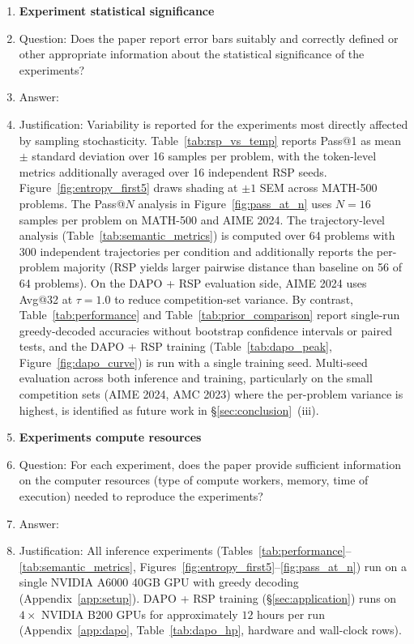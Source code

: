 \begin{enumerate}
\item {\bf Experiment statistical significance}\label{checklist:significance}
    \item[] Question: Does the paper report error bars suitably and correctly defined or other appropriate information about the statistical significance of the experiments?
    \item[] Answer: \answerNo{}
    \item[] Justification: Variability is reported for the experiments most directly affected by sampling stochasticity. Table~\ref{tab:rsp_vs_temp} reports Pass@1 as mean $\pm$ standard deviation over 16 samples per problem, with the token-level metrics additionally averaged over 16 independent RSP seeds. Figure~\ref{fig:entropy_first5} draws shading at $\pm 1$ SEM across MATH-500 problems. The Pass@$N$ analysis in Figure~\ref{fig:pass_at_n} uses $N=16$ samples per problem on MATH-500 and AIME 2024. The trajectory-level analysis (Table~\ref{tab:semantic_metrics}) is computed over 64 problems with 300 independent trajectories per condition and additionally reports the per-problem majority (RSP yields larger pairwise distance than baseline on 56 of 64 problems). On the DAPO + RSP evaluation side, AIME 2024 uses Avg@32 at $\tau=1.0$ to reduce competition-set variance. By contrast, Table~\ref{tab:performance} and Table~\ref{tab:prior_comparison} report single-run greedy-decoded accuracies without bootstrap confidence intervals or paired tests, and the DAPO + RSP training (Table~\ref{tab:dapo_peak}, Figure~\ref{fig:dapo_curve}) is run with a single training seed. Multi-seed evaluation across both inference and training, particularly on the small competition sets (AIME 2024, AMC 2023) where the per-problem variance is highest, is identified as future work in \S\ref{sec:conclusion}~(iii).

\item {\bf Experiments compute resources}
    \item[] Question: For each experiment, does the paper provide sufficient information on the computer resources (type of compute workers, memory, time of execution) needed to reproduce the experiments?
    \item[] Answer: \answerYes{}
    \item[] Justification: All inference experiments (Tables~\ref{tab:performance}--\ref{tab:semantic_metrics}, Figures~\ref{fig:entropy_first5}--\ref{fig:pass_at_n}) run on a single NVIDIA A6000 40GB GPU with greedy decoding (Appendix~\ref{app:setup}). DAPO + RSP training (\S\ref{sec:application}) runs on $4\times$ NVIDIA B200 GPUs for approximately $12$ hours per run (Appendix~\ref{app:dapo}, Table~\ref{tab:dapo_hp}, hardware and wall-clock rows).


\end{enumerate}
